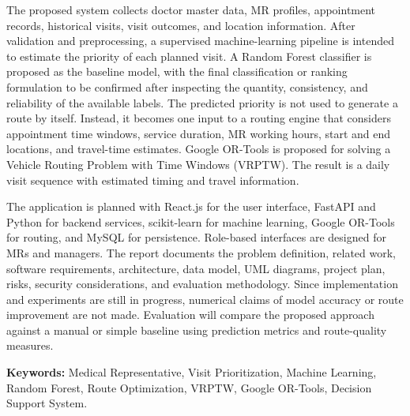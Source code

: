\documentclass[12pt,a4paper,oneside]{report}
\begin{document}
The proposed system collects doctor master data, MR profiles, appointment records, historical visits, visit outcomes, and location information. After validation and preprocessing, a supervised machine-learning pipeline is intended to estimate the priority of each planned visit. A Random Forest classifier is proposed as the baseline model, with the final classification or ranking formulation to be confirmed after inspecting the quantity, consistency, and reliability of the available labels. The predicted priority is not used to generate a route by itself. Instead, it becomes one input to a routing engine that considers appointment time windows, service duration, MR working hours, start and end locations, and travel-time estimates. Google OR-Tools is proposed for solving a Vehicle Routing Problem with Time Windows (VRPTW). The result is a daily visit sequence with estimated timing and travel information.

The application is planned with React.js for the user interface, FastAPI and Python for backend services, scikit-learn for machine learning, Google OR-Tools for routing, and MySQL for persistence. Role-based interfaces are designed for MRs and managers. The report documents the problem definition, related work, software requirements, architecture, data model, UML diagrams, project plan, risks, security considerations, and evaluation methodology. Since implementation and experiments are still in progress, numerical claims of model accuracy or route improvement are not made. Evaluation will compare the proposed approach against a manual or simple baseline using prediction metrics and route-quality measures.

\noindent\textbf{Keywords:} Medical Representative, Visit Prioritization, Machine Learning, Random Forest, Route Optimization, VRPTW, Google OR-Tools, Decision Support System.
\endgroup

\tableofcontents
\listoffigures
\listoftables
\end{document}
